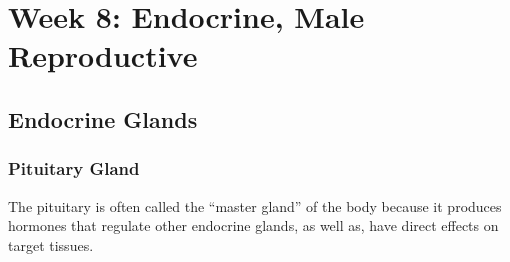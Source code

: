 \chapter{Week 8: Endocrine, Male Reproductive}

\section{Endocrine Glands}

\begin{center}
\end{center}

\subsection{Pituitary Gland}
The pituitary is often called the ``master gland'' of the body because it produces hormones that regulate other endocrine glands, as well as, have direct effects on target tissues.
\begin{center}
\end{center}
\begin{center}
\end{center}
\bigskip
